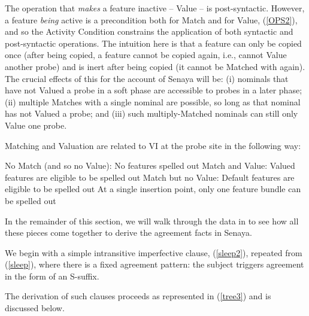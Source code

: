 \documentclass[output=paper
,modfonts
,nonflat]{langsci/langscibook}
\begin{document}
\noindent The operation that \textit{makes} a feature inactive -- Value -- is post-syntactic. However, a feature \textit{being} active is a precondition both for Match and for Value, (\ref{OPS2}), and so the Activity Condition constrains the application of both syntactic and post-syntactic operations. The intuition here is that a feature can only be copied once \citep{Bejar03} (after being copied, a feature cannot be copied again, i.e., cannot Value another probe) and is inert after being copied (it cannot be Matched with again). The crucial effects of this for the account of Senaya will be: (i) nominals that have not Valued a probe in a soft phase are accessible to probes in a later phase; (ii) multiple Matches with a single nominal are possible, so long as that nominal has not Valued a probe; and (iii) such multiply-Matched nominals can still only Value one probe.\largerpage

Matching and Valuation are related to VI at the probe site in the following way: 

\eal
\ex No Match (and so no Value): No features spelled out\footnotemark
\ex Match and Value: Valued features are eligible to be spelled out
\ex Match but no Value: Default features are eligible to be spelled out
\ex At a single insertion point, only one feature bundle can be spelled out
\zl 


\noindent In the remainder of this section, we will walk through the data in  to see how all these pieces come together to derive the agreement facts in Senaya. 

We begin with a simple intransitive imperfective clause, (\ref{sleep2}), repeated from (\ref{sleep}), where there is a fixed agreement pattern: the subject triggers agreement in the form of an S-suffix.

\z

\noindent The derivation of such clauses proceeds as represented in (\ref{tree3}) and is discussed below.\largerpage
\end{document}
